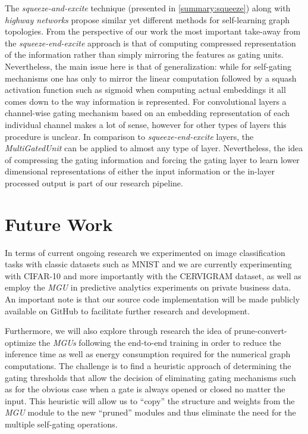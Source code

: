 \documentclass[11pt,a4paper]{article}
\begin{document}
The \textit{squeeze-and-excite} technique (presented in \ref{summary:squeeze}) along with \textit{highway networks} propose similar yet different methods for self-learning graph topologies. From the perspective of our work the most important take-away from the \textit{squeeze-end-excite} approach is that of computing compressed representation of the information rather than simply mirroring the features as gating units. Nevertheless, the main issue here is that of generalization: while for self-gating mechanisms one has only to mirror the linear computation followed by a squash activation function such as sigmoid when computing actual embeddings it all comes down to the way information is represented. For convolutional layers a channel-wise gating mechanism based on an embedding representation of each individual channel makes a lot of sense, however for other types of layers this procedure is unclear. In comparison to \textit{squeeze-end-excite} layers, the \textit{MultiGatedUnit} can be applied to almost any type of layer. Nevertheless, the idea of compressing the gating information and forcing the gating layer to learn lower dimensional representations of either the input information or the in-layer processed output is part of our research pipeline.


\section{Future Work}

In terms of current ongoing research we experimented on image classification tasks with classic datasets such as MNIST and we are currently experimenting with CIFAR-10 and more importantly with the CERVIGRAM \citep{xu2015new} dataset, as well as employ the \textit{MGU} in predictive analytics experiments on private business data. An important note is that our source code implementation will be made publicly available on GitHub to facilitate further research and development.

Furthermore, we will also explore through research the idea of prune-convert-optimize the \textit{MGUs} following the end-to-end training in order to reduce the inference time as well as energy consumption required for the numerical graph computations. The challenge is to find a heuristic approach of determining the gating thresholds that allow the decision of eliminating gating mechanisms such as for the obvious case when a gate is always opened or closed no matter the input. This heuristic will allow us to “copy” the structure and weights from the \textit{MGU} module to the new “pruned” modules and thus eliminate the need for the multiple self-gating operations.





\appendix
\end{document}
